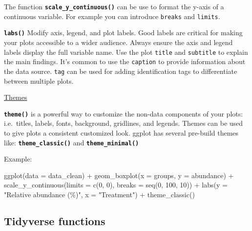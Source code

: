 \documentclass[
  letterpaper,
  DIV=11,
  numbers=noendperiod]{scrartcl}
\newenvironment{Shaded}{\begin{snugshade}}{\end{snugshade}}
\newcommand{\AttributeTok}[1]{\textcolor[rgb]{0.40,0.45,0.13}{#1}}
\newcommand{\DecValTok}[1]{\textcolor[rgb]{0.68,0.00,0.00}{#1}}
\newcommand{\FunctionTok}[1]{\textcolor[rgb]{0.28,0.35,0.67}{#1}}
\newcommand{\NormalTok}[1]{\textcolor[rgb]{0.00,0.23,0.31}{#1}}
\newcommand{\SpecialCharTok}[1]{\textcolor[rgb]{0.37,0.37,0.37}{#1}}
\newcommand{\StringTok}[1]{\textcolor[rgb]{0.13,0.47,0.30}{#1}}
\begin{document}
The function \textbf{\texttt{scale\_y\_continuous()}} can be use to
format the y-axis of a continuous variable. For example you can
introduce \texttt{breaks} and \texttt{limits}.

\textbf{\texttt{labs()}} Modify axis, legend, and plot labels. Good
labels are critical for making your plots accessible to a wider
audience. Always ensure the axis and legend labels display the full
variable name. Use the plot \texttt{title} and \texttt{subtitle} to
explain the main findings. It's common to use the \texttt{caption} to
provide information about the data source. \texttt{tag} can be used for
adding identification tags to differentiate between multiple plots.

\ul{Themes}

\textbf{\texttt{theme()}} is a powerful way to customize the non-data
components of your plots: i.e.~titles, labels, fonts, background,
gridlines, and legends. Themes can be used to give plots a consistent
customized look. ggplot has several pre-build themes like:
\textbf{\texttt{theme\_classic()}} and
\textbf{\texttt{theme\_minimal()}}

Example:

\begin{Shaded}
\begin{Highlighting}[]
\FunctionTok{ggplot}\NormalTok{(}\AttributeTok{data =}\NormalTok{ data\_clean) }\SpecialCharTok{+}
  \FunctionTok{geom\_boxplot}\NormalTok{(}\AttributeTok{x =}\NormalTok{ groups,}
               \AttributeTok{y =}\NormalTok{ abundance) }\SpecialCharTok{+}
  \FunctionTok{scale\_y\_continuous}\NormalTok{(}\AttributeTok{limits =} \FunctionTok{c}\NormalTok{(}\DecValTok{0}\NormalTok{, }\DecValTok{0}\NormalTok{),}
                     \AttributeTok{breaks =} \FunctionTok{seq}\NormalTok{(}\DecValTok{0}\NormalTok{, }\DecValTok{100}\NormalTok{, }\DecValTok{10}\NormalTok{)) }\SpecialCharTok{+}
  \FunctionTok{labs}\NormalTok{(}\AttributeTok{y =} \StringTok{"Relative abundance (\%)"}\NormalTok{,}
       \AttributeTok{x =} \StringTok{"Treatment"}\NormalTok{) }\SpecialCharTok{+}
  \FunctionTok{theme\_classic}\NormalTok{()}
\end{Highlighting}
\end{Shaded}

\hypertarget{tidyverse-functions}{%
\subsection{Tidyverse functions}\label{tidyverse-functions}}
\end{document}
